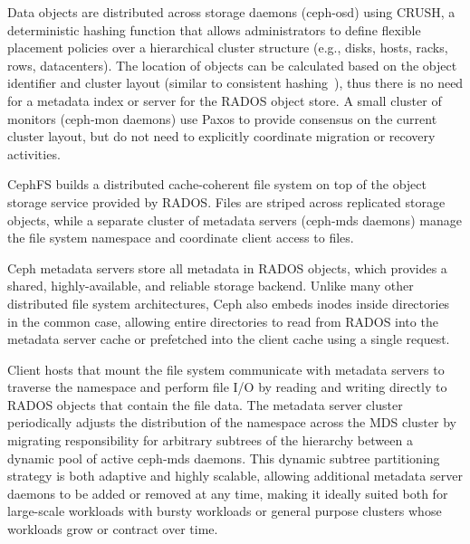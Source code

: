 Data objects are distributed across storage daemons (ceph-osd) using
CRUSH\cite{Weil:2006:Crush}, a deterministic hashing function that allows
administrators to define flexible placement policies over a hierarchical
cluster structure (e.g., disks, hosts, racks, rows, datacenters).  The
location of objects can be calculated based on the object identifier and
cluster layout (similar to consistent hashing~\cite{karger1997consistent}),
thus there is no need for a metadata index or server for the RADOS object store.
A small cluster of monitors (ceph-mon daemons) use Paxos to provide consensus on
the current cluster layout, but do not need to explicitly coordinate migration
or recovery activities.

CephFS builds a distributed cache-coherent file system on top of the object
storage service provided by RADOS.  Files are striped across replicated
storage objects, while a separate cluster of metadata servers (ceph-mds
daemons) manage the file system namespace and coordinate client access to
files.  

Ceph metadata servers store all metadata in RADOS objects, which provides a
shared, highly-available, and reliable storage backend.  Unlike many other
distributed file system architectures, Ceph also embeds inodes inside
directories in the common case, allowing entire directories to read from RADOS
into the metadata server cache or prefetched into the client cache using a
single request.

Client hosts that mount the file system communicate with metadata
servers to traverse the namespace and perform file I/O by reading and writing
directly to RADOS objects that contain the file data.  The metadata server
cluster periodically adjusts
the distribution of the namespace across the MDS cluster by migrating
responsibility for arbitrary subtrees of the hierarchy between a dynamic pool
of active ceph-mds daemons.  This dynamic subtree
partitioning~\cite{Weil:2004:dynamic} strategy is both adaptive and highly
scalable, allowing additional metadata server daemons to be added or removed
at any time, making it ideally suited both for large-scale workloads with
bursty workloads or general purpose clusters whose workloads grow or contract
over time.

